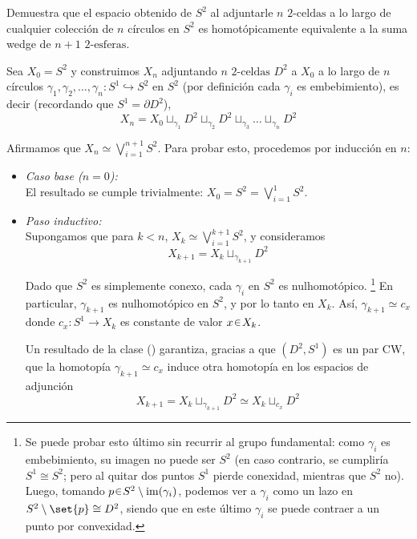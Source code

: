 \setcounter{eje}{18}
\begin{ejer}
Demuestra que el espacio obtenido de $S^2$ al adjuntarle $n$ $2\text{-celdas}$ a lo largo de cualquier colección de $n$ círculos en $S^2$ es homotópicamente equivalente a la suma wedge de $n+1$ $2\text{-esferas}$.
\end{ejer}
\begin{sol}[Demostración]
Sea $X_0 = S^2$ y construimos $X_n$ adjuntando $n$ $2\text{-celdas}$ $D^2$ a $X_0$ a lo largo de $n$ círculos $\gamma_1, \gamma_2, \dots, \gamma_n \colon S^1 \hookrightarrow S^2$ en $S^2$ (por definición cada $\gamma_i$ es embebimiento), es decir (recordando que $S^1 = \partial D^2$), 
\[
X_n = X_0 \sqcup_{\gamma_1} D^2 \sqcup_{\gamma_2} D^2 \sqcup_{\gamma_3} \dots \sqcup_{\gamma_n} D^2
\]

Afirmamos que $X_n \simeq \bigvee_{i=1}^{n+1} S^2$. Para probar esto, procedemos por inducción en $n$:

\begin{itemize}
\item \emph{Caso base ($n = 0$):} \\
El resultado se cumple trivialmente: $X_0 = S^2=\bigvee^1_{i=1} S^2$.

\item \emph{Paso inductivo:} \\
Supongamos que para $k < n$, $X_k \simeq \bigvee_{i=1}^{k+1} S^2$, y consideramos 
\[
X_{k+1} = X_k \sqcup_{\gamma_{k+1}} D^2
\] 

Dado que $S^2$ es simplemente conexo, cada $\gamma_i$ en $S^2$ es nulhomotópico.%
\footnote{
Se puede probar esto último sin recurrir al grupo fundamental: como $\gamma_i$ es embebimiento, su imagen no puede ser $S^2$ (en caso contrario, se cumpliría $S^1 \cong S^2$; pero al quitar dos puntos $S^1$ pierde conexidad, mientras que $S^2$ no). Luego, tomando $p \en S^2\setminus\im(\gamma_i)$, podemos ver a $\gamma_i$ como un lazo en $S^2\setminus\set{p} \cong D^2$, siendo que en este último $\gamma_i$ se puede contraer a un punto por convexidad.
}
En particular, $\gamma_{k+1}$ es nulhomotópico en $S^2$, y por lo tanto en $X_k$. Así, $\gamma_{k+1} \simeq c_x$ donde $c_x: S^1 \to X_k$ es constante de valor $x\en X_k$.

Un resultado de la clase (\cite[p. 13]{hatcher2002algebraic}) garantiza, gracias a que $(D^2,S^1)$ es un par CW, que la homotopía $\gamma_{k+1} \simeq c_x$ induce otra homotopía en los espacios de adjunción
\[
X_{k+1} = X_k \sqcup_{\gamma_{k+1}} D^2 \simeq X_k \sqcup_{c_x} D^2
\]


\end{itemize}
\end{sol}
